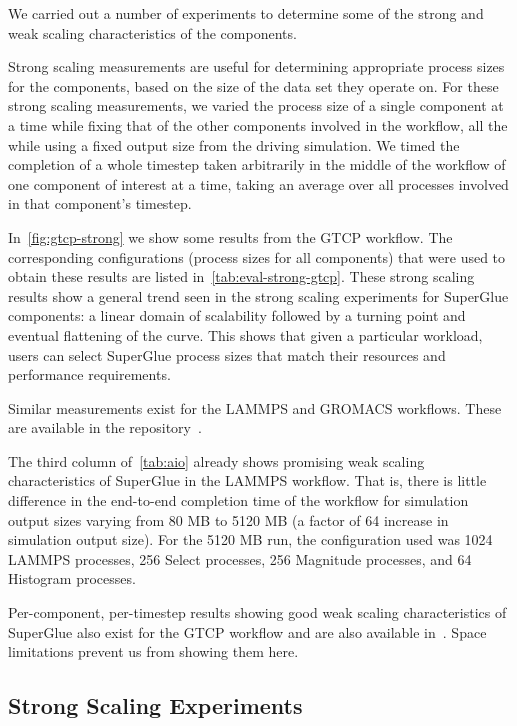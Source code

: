 We carried out a number of experiments
to determine some of the strong and weak scaling
characteristics of the components.

Strong scaling measurements are useful for
determining appropriate process sizes
for the components, based on the size of the
data set they operate on.
For these strong scaling measurements,
we varied the process size of a single component at
a time while fixing that of the
other components involved in the workflow,
all the while using a fixed output size from
the driving simulation.
We timed the completion of a whole timestep
taken arbitrarily in the middle of the workflow
of one component of interest at a time,
taking an average over all processes
involved in that component's timestep.

In~\autoref{fig:gtcp-strong} we show some results 
from the GTCP workflow.
The corresponding configurations (process sizes for all components)
that were used to obtain these results are listed
in~\autoref{tab:eval-strong-gtcp}.
These strong scaling results show a general trend
seen in the strong scaling experiments for SuperGlue
components: a linear domain of scalability followed
by a turning point and eventual flattening
of the curve. This shows
that given
a particular workload, users can select SuperGlue process sizes
that match their resources and performance requirements.

Similar measurements exist for the LAMMPS and GROMACS workflows.
These are available in the repository~\cite{champsaur:superglue-repo}.

The third column of~\autoref{tab:aio} already
shows promising
weak scaling characteristics of SuperGlue
in the LAMMPS workflow. That is, there is little
difference in the end-to-end
completion time of the workflow
for simulation output sizes varying
from 80 MB to 5120 MB (a factor of 64
increase in simulation output size).
For the 5120 MB run, the configuration used
was 1024 LAMMPS processes, 256 Select processes,
256 Magnitude processes, and 64 Histogram processes.

Per-component, per-timestep results
showing good weak scaling characteristics of
SuperGlue
also exist for the GTCP workflow and are also
available in~\cite{champsaur:superglue-repo}.
Space limitations prevent us
from showing them here.

\subsection{Strong Scaling Experiments}


